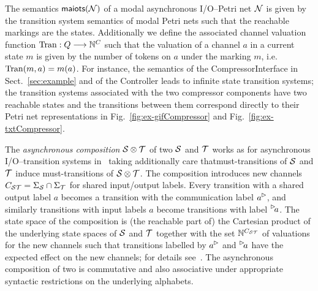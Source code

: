 The semantics $\maiots(\pnN)$ of a modal asynchronous I/O--Petri net $\pnN$ is given by the transition system semantics of modal Petri nets such that the reachable
markings are the states. Additionally we define the associated channel valuation function $\val: Q  \goes{} \N^{\chan}$ such that
the valuation of a channel $a$ in a current state $m$ is given by the number of tokens on $a$
under the marking $m$, i.e.\ $\val(m,a) = m(a)$.
For instance, the semantics of the \textsf{CompressorInterface} in Sect.~\ref{sec:example} and of the \textsf{Controller} leads to
 infinite state transition systems;
the transition systems associated with the two compressor components
have two reachable states and the transitions between them correspond directly to their Petri net representations 
in Fig.~\ref{fig:ex-gifCompressor} and  Fig.~\ref{fig:ex-txtCompressor}.
%
%
%    

The \emph{asynchronous composition} $\S \compos \T$ of two \MAIOTSs $\S$ and $\T$ works as for asynchronous I/O--transition systems in~\cite{haddad-et-al-2013} taking additionally care that\linebreak must-transitions of $\S$ and $\T$ induce must-transitions of  $\S \compos \T$.
The composition introduces new channels $\chan_{\S\T} = \Sigma_\S \cap \Sigma_\T$ for shared input/output labels.
Every transition with a shared output label $a$ becomes a transition with the communication label $\outact{a}$,
and similarly transitions with input labels $a$ become transitions with label $\inact{a}$.
The state space of the composition is (the reachable part of) the Cartesian product of the underlying state spaces of $\S$ and $\T$ together with the set $\N^{\chan_{\S\T}}$ of valuations for the new channels such that transitions labelled by  $\outact{a}$ and $\inact{a}$ have the expected effect on the new channels; for details see~\cite{haddad-et-al-2013}.
The asynchronous composition of two \MAIOTSs is commutative and also associative under appropriate syntactic restrictions on the underlying alphabets.

